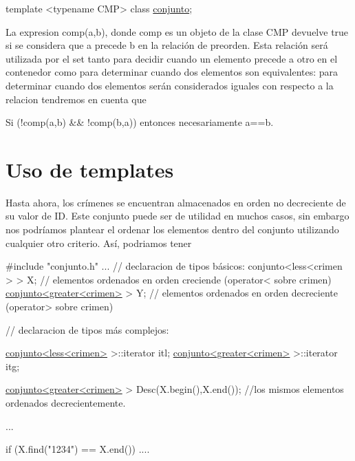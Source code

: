 \begin{DoxyCode}
\textcolor{keyword}{template} <\textcolor{keyword}{typename} CMP> \textcolor{keyword}{class }\hyperlink{classconjunto}{conjunto};
\end{DoxyCode}


La expresion comp(a,b), donde comp es un objeto de la clase C\-M\-P devuelve true si se considera que a precede b en la relación de preorden. Esta relación será utilizada por el set tanto para decidir cuando un elemento precede a otro en el contenedor como para determinar cuando dos elementos son equivalentes\-: para determinar cuando dos elementos serán considerados iguales con respecto a la relacion tendremos en cuenta que \begin{DoxyItemize}
\item Si (!comp(a,b) \&\& !comp(b,a)) entonces necesariamente a==b.\end{DoxyItemize}
\hypertarget{index_platillas}{}\section{Uso de templates}\label{index_platillas}
Hasta ahora, los crímenes se encuentran almacenados en orden no decreciente de su valor de I\-D. Este conjunto puede ser de utilidad en muchos casos, sin embargo nos podríamos plantear el ordenar los elementos dentro del conjunto utilizando cualquier otro criterio. Así, podriamos tener


\begin{DoxyCode}
\textcolor{preprocessor}{#include "conjunto.h"}
...
\textcolor{comment}{// declaracion de tipos básicos:}
conjunto<less<crimen > > X;  \textcolor{comment}{// elementos ordenados en orden creciende  (operator< sobre crimen)}
\hyperlink{classconjunto}{conjunto<greater<crimen>} > Y; \textcolor{comment}{// elementos ordenados en orden decreciente
       (operator> sobre crimen)}

\textcolor{comment}{// declaracion de tipos más complejos:}

\hyperlink{classconjunto}{conjunto<less<crimen>} >::iterator itl;
\hyperlink{classconjunto}{conjunto<greater<crimen>} >::iterator itg;

\hyperlink{classconjunto}{conjunto<greater<crimen>} > Desc(X.begin(),X.end()); \textcolor{comment}{//los mismos elementos
       ordenados decrecientemente.}

... 

\textcolor{keywordflow}{if} (X.find(\textcolor{stringliteral}{"1234"}) == X.end()) 
   ....
\end{DoxyCode}


